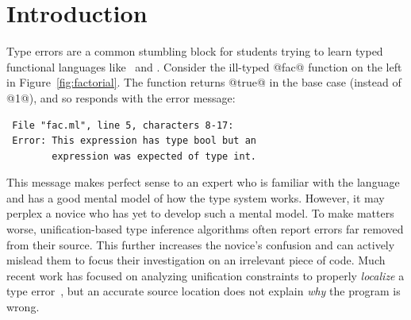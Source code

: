 \section{Introduction}
\label{sec:introduction}

Type errors are a common stumbling block for students
trying to learn typed functional languages like \ocaml\
and \haskell.
%
Consider the ill-typed @fac@ function on the left in
Figure~\ref{fig:factorial}.
%
The function returns @true@ in the base case (instead of @1@),
and so \ocaml responds with the error message:
%
\begin{verbatim}
 File "fac.ml", line 5, characters 8-17:
 Error: This expression has type bool but an
        expression was expected of type int.
\end{verbatim}
%
This message makes perfect sense to an expert who is familiar
with the language and has a good mental model of how the type
system works.
%
However, it may perplex a novice who has yet to develop such a
mental model.
%
To make matters worse, unification-based type inference algorithms
often report errors far removed from their source.
%
This further increases the novice's confusion and can actively mislead
them to focus their investigation on an irrelevant piece of code.
%
Much recent work has focused on analyzing unification constraints
to properly \emph{localize} a type error~\cite{Lerner2007-dt,Chen2014-gd,Zhang2014-lv,Pavlinovic2014-mr},
but an accurate source location does not explain \emph{why} the
program is wrong.


